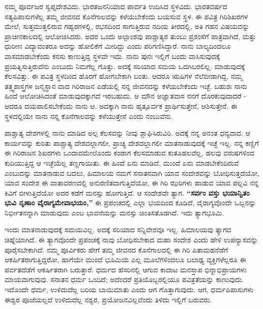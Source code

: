 \vskip 5pt

ನಮ್ಮ ಪೂರ್ವಜರ ಸ್ವಪ್ನದೇಶವಿದು. ಭಾರತಜನನಿಯಾದ ಪಾರ್ವತಿ ಉದಿಸಿದ ಸ್ಥಳವಿದು. ಭಾರತವರ್ಷದ ಸತ್ಯಪಿಪಾಸುಗಳೆಲ್ಲ ತಮ್ಮ ಜೀವನದ ಕೊನೆಗಾಲವನ್ನು ಕಳೆಯಬೇಕೆಂದು ಬಯಸುವ ಸ್ಥಳ. ಈ ಪವಿತ್ರ ಗಿರಿಶಿಖರಗಳ ಮೇಲೆ, ಸುತ್ತಮುತ್ತಲಿರುವ ಗಹ್ವರಗಳಲ್ಲಿ, ರಭಸದಿಂದ ಸಾಗುತ್ತಿರುವ ನದಿಯ ತೀರದಲ್ಲಿ, ಅತಿ ಗಹನ ವಿಷಯವನ್ನು ಪ್ರಾಚೀನಕಾಲದಲ್ಲಿ ಆಲೋಚಿಸಿದರು. ಅದರ ಒಂದು ಅಲ್ಪಾಂಶವು ಪಾಶ್ಚಾತ್ಯರ ತುಂಬು ಪ್ರಶಂಸೆಗೆ ಪಾತ್ರವಾಗಿದೆ, ಮತ್ತು ಧುರೀಣ ವಿದ್ಯಾವಂತರೂ ಅದನ್ನು ಹೋಲಿಕೆಗೆ ಮೀರಿದ್ದು ಎಂದು ಪರಿಗಣಿಸಿದ್ದಾರೆ. ನಾನು ಬಾಲ್ಯದಿಂದಲೂ ವಾಸಮಾಡಬೇಕೆಂದು ಕನಸು ಕಾಣುತ್ತಿದ್ದ ಸ್ಥಳವೇ ಇದು. ನಾನು ಪುನಃ ಇಲ್ಲಿಗೆ ಬಂದು ವಾಸಿಸುವುದಕ್ಕೆ ಪ್ರಯತ್ನಿಸುತ್ತಿರುವೆನು ಎಂಬುದು ನಿಮಗೆಲ್ಲ ಗೊತ್ತು. ಅದಕ್ಕೆ ಸರಿಯಾದ ಸಮಯ ಒದಗಿಬರಲಿಲ್ಲ. ಮಾಡುವುದಕ್ಕೆ ಕೆಲಸವಿತ್ತು. ಈ ಪವಿತ್ರ ಸ್ಥಳದಿಂದ ಹೊರಗೆ ಹೋಗಬೇಕಾಗಿ ಬಂತು. ಆದರೂ ಋಷಿಗಳ ನೆಲೆಬೀಡಾಗಿದ್ದ, ನಮ್ಮ ತತ್ತ್ವಶಾಸ್ತ್ರಗಳ ಜನ್ಮಸ್ಥಾನ ವಾದ ಗಿರಿರಾಜನ ಎಡೆಯಲ್ಲಿ ನನ್ನ ಜೀವನವನ್ನು ಕಳೆಯಬೇಕೆಂದು ಇಚ್ಛೆ. ಬಹುಶಃ ನಾನು ಹಿಂದೆ ಆಲೋಚಿಸಿದಂತೆ ಮಾಡುವುದಕ್ಕಾಗದೆ ಇರಬಹುದು. ಆ ಮೌನ ಅಜ್ಞಾತವಾಸ ನನಗೆ ದೊರಕುವುದಾದರೆ - ಆದರೂ ದಯಪಾಲಿಸಬೇಕೆಂದು ನಾನು ಆ, ಅದಕ್ಕಾಗಿ ನಾನು ಹೃತ್ಪೂರ್ವಕ ಪ್ರಾರ್ಥಿಸುತ್ತೇನೆ, ಆಶಿಸುತ್ತೇನೆ. ಈ ಸ್ಥಳದಲ್ಲಿಯೇ ನಾನು ನನ್ನ ಕೊನೆಗಾಲವನ್ನು ಕಳೆಯುತ್ತೇನೆ ಎಂದು ನಂಬುವೆನು.

\newpage

ಪಾಶ್ಚಾತ್ಯ ದೇಶಗಳಲ್ಲಿ ನಾನು ಮಾಡಿದ ಅಲ್ಪ ಕೆಲಸವನ್ನು ನೀವು ಶ್ಲಾಘಿಸಿರುವಿರಿ. ಅದಕ್ಕೆ ನನ್ನ ಅನಂತ ಧನ್ಯವಾದ. ಆ ಕಾರ್ಯವನ್ನು ಕುರಿತು ಪಾಶ್ಚಾತ್ಯ ದೇಶದಲ್ಲಾಗಲೀ, ಪ್ರಾಚ್ಯ ದೇಶದಲ್ಲಾಗಲೀ ಮಾತನಾಡುವುದಕ್ಕೆ ಇಚ್ಛೆ ಇಲ್ಲ. ನನ್ನ ಕಣ್ಣಿಗೆ ಈ ಗಿರಿರಾಜನ ಶಿಖರಗಳು ಒಂದಾದಮೇಲೊಂದು ಕಂಡಾಗ ಕೆಲಸಮಾಡುವ ಕುತೂಹಲವೆಲ್ಲ, ಹಲವು ವರುಷಗಳಿಂದ ಕುದಿಯುತ್ತಿದ್ದ ಆ ಇಚ್ಛೆಯೆಲ್ಲ ತಣ್ಣಗಾಯಿತು. ಈ ಹಿಂದೆ ಏನು ಮಾಡಿದೆ, ಮುಂದೆ ಏನು ಮಾಡಬೇಕೆಂದಿರುವೆ ಎಂಬುದನ್ನು ಮಾತನಾಡುವ ಬದಲು, ಹಿಮಾಲಯ ನಮಗೆ ಸನಾತನವಾಗಿ ಯಾವ ಸಂದೇಶವನ್ನು ಬೋಧಿಸುತ್ತದೆಯೋ, ಯಾವ ಸಂದೇಶ ಈ ವಾತಾವರಣದಲ್ಲಿ ಅನುರಣಿತವಾಗುತ್ತಿದೆಯೋ, ಈ ಗಿರಿ ಝರಿಗಳು ಹಾಡುವ ಯಾವ ಪಲ್ಲವಿ ನನ್ನ ಕಿವಿಗೆ ಬೀಳುತ್ತಿದೆಯೋ ಅದರ ಕಡೆಗೆ ಮನಸ್ಸು ಹೋಗುತ್ತಿದೆ. ಆ ಸಂದೇಶವೇ ತ್ಯಾಗ. \textbf{“ಸರ್ವಂ ವಸ್ತು ಭಯಾನ್ವಿತಂ ಭುವಿ ನೃಣಾಂ ವೈರಾಗ್ಯಮೇವಾಭಯಂ,”} ಈ ಪ್ರಪಂಚದಲ್ಲಿ ಎಲ್ಲಾ ಭಯದಿಂದ ಕೂಡಿದೆ, ವೈರಾಗ್ಯವೊಂದೇ ಒಬ್ಬನನ್ನು ನಿರ್ಭೀತನನ್ನಾಗಿ ಮಾಡುವುದು ಎಂಬ ಭಾವನೆಯನ್ನು ಮನಸ್ಸು ಚಿಂತಿಸತೊಡಗಿದೆ. ಇದು ತ್ಯಾಗಭೂಮಿ.

\vskip 5pt

ಇಂದು ಮಾತನಾಡುವುದಕ್ಕೆ ಸಮಯವಿಲ್ಲ. ಅದಕ್ಕೆ ಸರಿಯಾದ ಸನ್ನಿವೇಶವೂ ಇಲ್ಲ. ಹಿಮಾಲಯವು ತ್ಯಾಗದ ಚಿಹ್ನೆಯಾಗಿದೆ. ಈ ತ್ಯಾಗವೊಂದೇ ಪ್ರಪಂಚಕ್ಕೆ ನಾವು ಬೋಧಿಸಬೇಕಾದ ಮಹಾ ಸಂದೇಶ ಎಂದು ಹೇಳಿ ಉಪನ್ಯಾಸವನ್ನು ಪೂರೈಸಬೇಕಾಗಿದೆ. ನಮ್ಮ ಪೂರ್ವಿಕರು ಹೇಗೆ ತಮ್ಮ ಜೀವನದ ಕೊನೆಗಾಲದಲ್ಲಿ ಈ ಗಿರಿ ಪಿತಾಮಹನೆಡೆಗೆ ಆಕರ್ಷಿತರಾಗುತ್ತಿದ್ದರೋ, ಹಾಗೆಯೇ ಮುಂದೆ ಭೂಮಿಯ ಎಲ್ಲ ಮೂಲೆಗಳಿಂದಲೂ ಬಲಾಢ್ಯ ವ್ಯಕ್ತಿಗಳೆಲ್ಲರೂ ಈ ಪರ್ವತದೆಡೆಗೆ ಆಕರ್ಷಿತರಾಗಿ ಬರುತ್ತಾರೆ. ಧರ್ಮದ ಹೆಸರಿನಲ್ಲಿ ಆಗುವ ಕಾದಾಟ ಮನಸ್ತಾಪ ಭಿನ್ನಾಭಿಪ್ರಾಯಗಳು ಮಾಯವಾಗುವುವು. ಸನಾತನ ಧರ್ಮ ಒಂದಿದೆ; ಅದೆಂದರೆ ಪ್ರತಿಯೊಬ್ಬರಲ್ಲಿಯೂ ಪವಿತ್ರತೆಯನ್ನು ಕಾಣುವುದು. ಇದೊಂದೇ ಧರ್ಮ, ಉಳಿದುದೆಲ್ಲ ಬರಿಯ ಬಾಯಿಮಾತು ಎಂದು ಆಗ ಗೊತ್ತಾಗುವುದು. ಆಗ, ಧರ್ಮಪಿಪಾಸುಗಳು ಈಶ್ವರ ಪೂಜೆಯಲ್ಲದೆ ಉಳಿದುದೆಲ್ಲ ನಶ್ವರ, ಪ್ರಯೋಜನವಿಲ್ಲವೆಂದು ತಿಳಿದು ಇಲ್ಲಿಗೆ ಬರುವರು.

